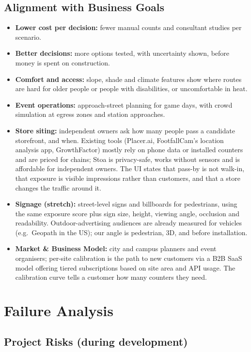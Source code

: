 \documentclass[11pt]{article}
\begin{document}
\subsection{Alignment with Business Goals}
\begin{itemize}
  \item \textbf{Lower cost per decision:} fewer manual counts and consultant studies per scenario.
  \item \textbf{Better decisions:} more options tested, with uncertainty shown, before money is spent on construction.
  \item \textbf{Comfort and access:} slope, shade and climate features show where routes are hard for older people or people with disabilities, or uncomfortable in heat.
  \item \textbf{Event operations:} approach-street planning for game days, with crowd simulation at egress zones and station approaches.
  \item \textbf{Store siting:} independent owners ask how many people pass a candidate storefront, and when. Existing tools (Placer.ai, FootfallCam's location analysis app, GrowthFactor) mostly rely on phone data or installed counters and are priced for chains; Stoa is privacy-safe, works without sensors and is affordable for independent owners. The UI states that pass-by is not walk-in, that exposure is visible impressions rather than customers, and that a store changes the traffic around it.
  \item \textbf{Signage (stretch):} street-level signs and billboards for pedestrians, using the same exposure score plus sign size, height, viewing angle, occlusion and readability. Outdoor-advertising audiences are already measured for vehicles (e.g.\ Geopath in the US); our angle is pedestrian, 3D, and before installation.
  \item \textbf{Market \& Business Model:} city and campus planners and event organisers; per-site calibration is the path to new customers via a B2B SaaS model offering tiered subscriptions based on site area and API usage. The calibration curve tells a customer how many counters they need.
\end{itemize}

\section{Failure Analysis}

\subsection{Project Risks (during development)}
\end{document}
